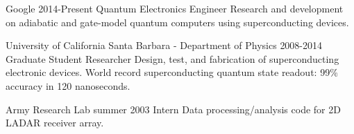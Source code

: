 \job
{Google}
{2014-Present}
{Quantum Electronics Engineer}
{Research and development on adiabatic and gate-model quantum computers using superconducting devices.}

\job
{University of California Santa Barbara - Department of Physics}
{2008-2014}
{Graduate Student Researcher}
{Design, test, and fabrication of superconducting electronic devices.
World record superconducting quantum state readout:
99\% accuracy in 120 nanoseconds.}

\job
{Army Research Lab}
{summer 2003}
{Intern}
{Data processing/analysis code for 2D LADAR receiver array.}

